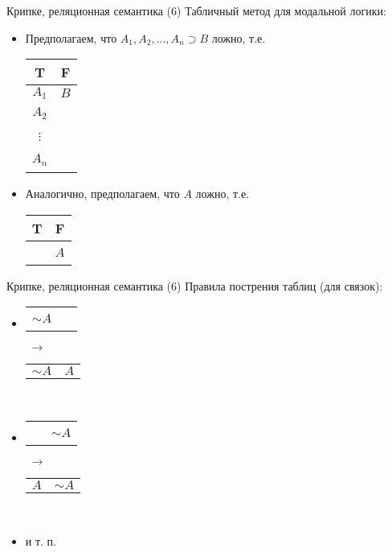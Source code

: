 \documentclass{beamer}
\begin{document}
\begin{frame}{Крипке, реляционная семантика (6)}
Табличный метод для модальной логики:\\
\bigskip
\begin{itemize}
  \item Предполагаем, что $A_1, A_2, ..., A_n \supset B$ ложно, т.е.
    \begin{table}
      \begin{tabular*}{1.5cm}{c|c}
        T   & F \\ \hline
        $A_1$ & $B$ \\
        $A_2$ & ~ \\
        $\vdots$ & ~ \\
        $A_n$ & ~ \\
      \end{tabular*}
    \end{table}
  \item Аналогично, предполагаем, что $A$ ложно, т.е. 
    \begin{table}
      \begin{tabular*}{1.3cm}{c|c}
        T   & F \\ \hline
        ~ & $A$ \\
      \end{tabular*}
    \end{table}
\end{itemize}
\end{frame}

\begin{frame}{Крипке, реляционная семантика (6)}
Правила пострения таблиц (для связок):\\
\bigskip
\begin{itemize}
  \item 
      \begin{tabular}{p{0.75cm}|p{0.75cm}}
        \hline
        $\sim \! A$ & ~ \\
      \end{tabular}
      $\; \to \;$
      \begin{tabular}{p{0.75cm}|p{0.75cm}}
        \hline
        $\sim \! A$ & $A$ \\
      \end{tabular}\\
      \bigskip
  \item 
      \begin{tabular}{p{0.75cm}|p{0.75cm}}
        \hline
        ~ & $\sim \! A$ \\
      \end{tabular}
      $\; \to \;$
      \begin{tabular}{p{0.75cm}|p{0.75cm}}
        \hline
        $A$ & $\sim \! A$ \\
      \end{tabular}\\
      \bigskip
  \item и т. п.
\end{itemize}
\end{frame}
\end{document}
